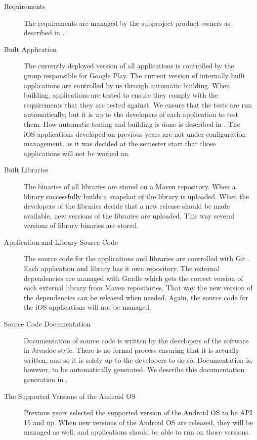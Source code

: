 \begin{description}
  \item[Requirements] The requirements are managed by the subproject product owners as described in .
  \item[Built Application] The currently deployed version of all applications is controlled by the group responsible for Google Play. The current version of internally built applications are controlled by us through automatic building. When building, applications are tested to ensure they comply with the requirements that they are tested against. We ensure that the tests are run automatically, but it is up to the developers of each application to test them. How automatic testing and building is done is described in  . The iOS applications developed on previous years are not under configuration management, as it was decided at the semester start that those applications will not be worked on.
  \item[Built Libraries] The binaries of all libraries are stored on a Maven repository. When a library successfully builds a snapshot of the library is uploaded. When the developers of the libraries decide that a new release should be made available, new versions of the libraries are uploaded. This way several versions of library binaries are stored.
  \item[Application and Library Source Code] The source code for the applications and libraries are controlled with Git \parencite{gitwebsite}. Each application and library has it own repository. The external dependencies are managed with Gradle which gets the correct version of each external library from Maven repositories. That way the new version of the dependencies can be released when needed. Again, the source code for the iOS applications will not be managed.
  \item[Source Code Documentation] Documentation of source code is written by the developers of the software in Javadoc style. There is no formal process ensuring that it is actually written, and so it is solely up to the developers to do so. Documentation is, however, to be automatically generated. We describe this documentation generation in  .
  \item[The Supported Versions of the Android OS] Previous years selected the supported version of the Android OS to be API 15 and up. When new versions of the Android OS are released, they will be managed as well, and applications should be able to run on those versions.

\end{description}
